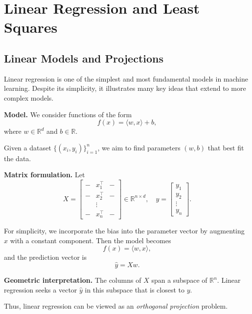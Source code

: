 \chapter{Linear Regression and Least Squares}

\section{Linear Models and Projections}

Linear regression is one of the simplest and most fundamental models in machine learning. Despite its simplicity, it illustrates many key ideas that extend to more complex models.

\medskip

\noindent
\textbf{Model.}  
We consider functions of the form
\[
f(x) = \langle w, x \rangle + b,
\]
where $w \in \mathbb{R}^d$ and $b \in \mathbb{R}$.

\medskip

Given a dataset $\{(x_i, y_i)\}_{i=1}^n$, we aim to find parameters $(w,b)$ that best fit the data.

\medskip

\noindent
\textbf{Matrix formulation.}  
Let
\[
X =
\begin{bmatrix}
- & x_1^\top & - \\
- & x_2^\top & - \\
& \vdots & \\
- & x_n^\top & -
\end{bmatrix}
\in \mathbb{R}^{n \times d},
\quad
y =
\begin{bmatrix}
y_1 \\ y_2 \\ \vdots \\ y_n
\end{bmatrix}.
\]

For simplicity, we incorporate the bias into the parameter vector by augmenting $x$ with a constant component. Then the model becomes
\[
f(x) = \langle w, x \rangle,
\]
and the prediction vector is
\[
\hat{y} = X w.
\]

\medskip

\noindent
\textbf{Geometric interpretation.}  
The columns of $X$ span a subspace of $\mathbb{R}^n$. Linear regression seeks a vector $\hat{y}$ in this subspace that is closest to $y$.

\medskip

\noindent
Thus, linear regression can be viewed as an \emph{orthogonal projection} problem.

